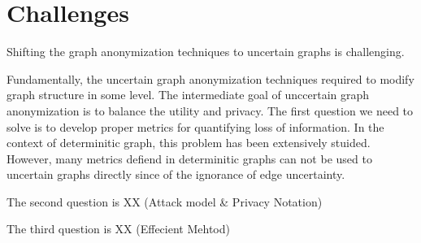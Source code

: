 \section{Challenges}
\label{sec:challenges}
Shifting the graph anonymization techniques to uncertain graphs is challenging. 

Fundamentally, the uncertain graph anonymization techniques required to modify graph structure in some level. The intermediate goal of unccertain graph anonymization is to balance the utility and privacy. The first question we need to solve is to develop proper metrics for quantifying loss of information. In the context of determinitic graph, this problem has been extensively stuided. However, many metrics defiend in determinitic graphs can not be used to uncertain graphs directly since of the ignorance of edge uncertainty.  


The second question is XX (Attack model & Privacy Notation)


The third question is XX  (Effecient Mehtod)
